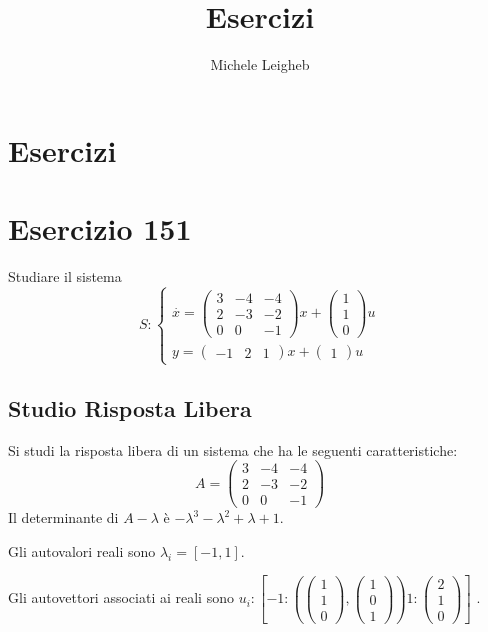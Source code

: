 \documentclass{article}
\title{Esercizi}
\author{Michele Leigheb}
\date{}
\begin{document}
\maketitle
\tableofcontents{}




\section{Esercizi}

\section{Esercizio 151 }
 Studiare il sistema \[S:\begin{cases}\overset{\cdot}{x} = \left(\begin{matrix}3 & -4 & -4\\2 & -3 & -2\\0 & 0 & -1\end{matrix}\right) x+ \left(\begin{matrix}1\\1\\0\end{matrix}\right)u\\y = \left(\begin{matrix}-1 & 2 & 1\end{matrix}\right) x +\left(\begin{matrix}1\end{matrix}\right) u\end{cases}\]\subsection{Studio Risposta Libera}
Si studi la risposta libera di un sistema che ha le seguenti caratteristiche: \[A = \left(\begin{matrix}3 & -4 & -4\\2 & -3 & -2\\0 & 0 & -1\end{matrix}\right)\]
Il determinante di $A-\lambda$ è $ - \lambda^{3} - \lambda^{2} + \lambda + 1 $.

Gli autovalori reali sono $\lambda_i = [-1, 1]$.

Gli autovettori associati ai reali sono $ u_i: [  -1: (\left(\begin{matrix}1\\1\\0\end{matrix}\right), \left(\begin{matrix}1\\0\\1\end{matrix}\right))1: \left(\begin{matrix}2\\1\\0\end{matrix}\right) ]$
.
\end{document}
